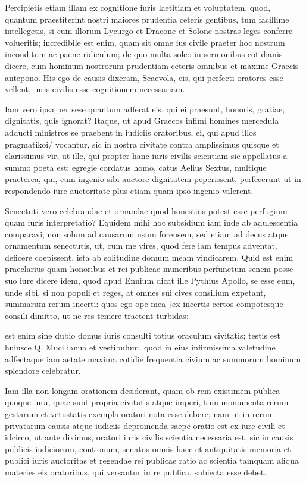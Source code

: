  Percipietis etiam illam ex cognitione iuris laetitiam et voluptatem, quod, quantum praestiterint nostri maiores prudentia ceteris gentibus, tum facillime intellegetis, si cum illorum Lycurgo et Dracone et Solone nostras leges conferre volueritis; incredibile est enim, quam sit omne ius civile praeter hoc nostrum inconditum ac paene ridiculum; de quo multa soleo in sermonibus cotidianis dicere, cum hominum nostrorum prudentiam ceteris omnibus et maxime Graecis antepono. His ego de causis dixeram, Scaevola, eis, qui perfecti oratores esse vellent, iuris civilis esse cognitionem necessariam.

 Iam vero ipsa per sese quantum adferat eis, qui ei praesunt, honoris, gratiae, dignitatis, quis ignorat? Itaque, ut apud Graecos infimi homines mercedula adducti ministros se praebent in iudiciis oratoribus, ei, qui apud illos pragmatikoi/ vocantur, sic in nostra civitate contra amplissimus quisque et clarissimus vir, ut ille, qui propter hanc iuris civilis scientiam sic appellatus a summo poeta est: egregie cordatus homo, catus Aelius Sextus, multique praeterea, qui, cum ingenio sibi auctore dignitatem peperissent, perfecerunt ut in respondendo iure auctoritate plus etiam quam ipso ingenio valerent.

 Senectuti vero celebrandae et ornandae quod honestius potest esse perfugium quam iuris interpretatio? Equidem mihi hoc subsidium iam inde ab adulescentia comparavi, non solum ad causarum usum forensem, sed etiam ad decus atque ornamentum senectutis, ut, cum me vires, quod fere iam tempus adventat, deficere coepissent, ista ab solitudine domum meam vindicarem. Quid est enim praeclarius quam honoribus et rei publicae muneribus perfunctum senem posse suo iure dicere idem, quod apud Ennium dicat ille Pythius Apollo, se esse eum, unde sibi, si non populi et reges, at omnes sui cives consilium expetant, summarum rerum incerti: quos ego ope mea †ex incertis certos compotesque consili dimitto, ut ne res temere tractent turbidas:

 est enim sine dubio domus iuris consulti totius oraculum civitatis; testis est huiusce Q. Muci ianua et vestibulum, quod in eius infirmissima valetudine adfectaque iam aetate maxima cotidie frequentia civium ac summorum hominum splendore celebratur.

 Iam illa non longam orationem desiderant, quam ob rem existimem publica quoque iura, quae sunt propria civitatis atque imperi, tum monumenta rerum gestarum et vetustatis exempla oratori nota esse debere; nam ut in rerum privatarum causis atque iudiciis depromenda saepe oratio est ex iure civili et idcirco, ut ante diximus, oratori iuris civilis scientia necessaria est, sic in causis publicis iudiciorum, contionum, senatus omnis haec et antiquitatis memoria et publici iuris auctoritas et regendae rei publicae ratio ac scientia tamquam aliqua materies eis oratoribus, qui versantur in re publica, subiecta esse debet.

